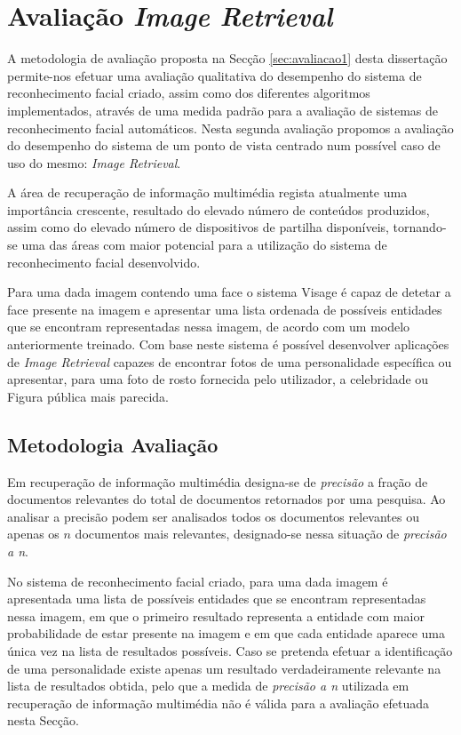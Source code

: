 \section{Avaliação \textit{Image Retrieval}} \label{sec:avaliacao2}
A metodologia de avaliação proposta na Secção \ref{sec:avaliacao1} desta dissertação permite-nos efetuar uma avaliação qualitativa do desempenho do sistema de reconhecimento facial criado, assim como dos diferentes algoritmos implementados, através de uma medida padrão para a avaliação de sistemas de reconhecimento facial automáticos. Nesta segunda avaliação propomos a avaliação do desempenho do sistema de um ponto de vista centrado num possível caso de uso do mesmo: \textit{Image Retrieval}.

A área de recuperação de informação multimédia regista atualmente uma importância crescente, resultado do elevado número de conteúdos produzidos, assim como do elevado número de dispositivos de partilha disponíveis, tornando-se uma das áreas com maior potencial para a utilização do sistema de reconhecimento facial desenvolvido.

Para uma dada imagem contendo uma face o sistema Visage é capaz de detetar a face presente na imagem e apresentar uma lista ordenada de possíveis entidades que se encontram representadas nessa imagem, de acordo com um modelo anteriormente treinado. Com base neste sistema é possível desenvolver aplicações de \textit{Image Retrieval} capazes de encontrar fotos de uma personalidade específica ou apresentar, para uma foto de rosto fornecida pelo utilizador, a celebridade ou Figura pública mais parecida.

\subsection{Metodologia Avaliação}
Em recuperação de informação multimédia designa-se de \textit{precisão} a fração de documentos relevantes do total de documentos retornados por uma pesquisa. Ao analisar a precisão podem ser analisados todos os documentos relevantes ou apenas os $n$ documentos mais relevantes, designado-se nessa situação de \textit{precisão a n}.

No sistema de reconhecimento facial criado, para uma dada imagem é apresentada uma lista de possíveis entidades que se encontram representadas nessa imagem, em que o primeiro resultado representa a entidade com maior probabilidade de estar presente na imagem e em que cada entidade aparece uma única vez na lista de resultados possíveis. Caso se pretenda efetuar a identificação de uma personalidade existe apenas um resultado verdadeiramente relevante na lista de resultados obtida, pelo que a medida de \textit{precisão a n} utilizada em recuperação de informação multimédia não é válida para a avaliação efetuada nesta Secção.

